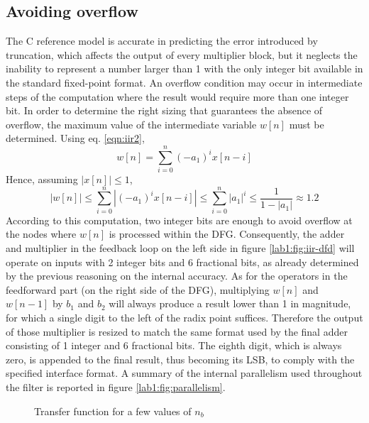 \subsection{Avoiding overflow}
 The C reference model is accurate in predicting the error introduced by truncation, which affects the output of every multiplier block, but it neglects the inability to represent a number larger than 1 with the only integer bit available in the standard fixed-point format. An overflow condition may occur in intermediate steps of the computation where the result would require more than one integer bit. In order to determine the right sizing that guarantees the absence of overflow, the maximum value of the intermediate variable $w[n]$ must be determined. Using eq. \ref{eqn:iir2},
\begin{equation*}
	w[n] = \sum_{i=0}^{n} (-a_1)^i x[n-i]
\end{equation*}
Hence, assuming $|x[n]|\leq 1$,
\begin{equation*}
	|w[n]|\leq
	\sum_{i=0}^{n} |(-a_1)^i x[n-i]| \leq
	\sum_{i=0}^{n} |a_1|^i \leq
	\frac{1}{1-|a_1|} \approx
	1.2
\end{equation*}
According to this computation, two integer bits are enough to avoid overflow at the nodes where $w[n]$ is processed within the DFG. Consequently, the adder and multiplier in the feedback loop on the left side in figure \ref{lab1:fig:iir-dfd} will operate on inputs with 2 integer bits and 6 fractional bits, as already determined by the previous reasoning on the internal accuracy.
As for the operators in the feedforward part (on the right side of the DFG), multiplying $w[n]$ and $w[n-1]$ by $b_1$ and $b_2$ will always produce a result lower than 1 in magnitude, for which a single digit to the left of the radix point suffices. Therefore the output of those multiplier is resized to match the same format used by the final adder consisting of 1 integer and 6 fractional bits. The eighth digit, which is always zero, is appended to the final result, thus becoming its LSB, to comply with the specified interface format. A summary of the internal parallelism used throughout the filter is reported in figure \ref{lab1:fig:parallelism}.
\begin{figure}
	\caption{Transfer function for a few values of $n_b$}
	\label{fig:tfcomparison}
\end{figure}
